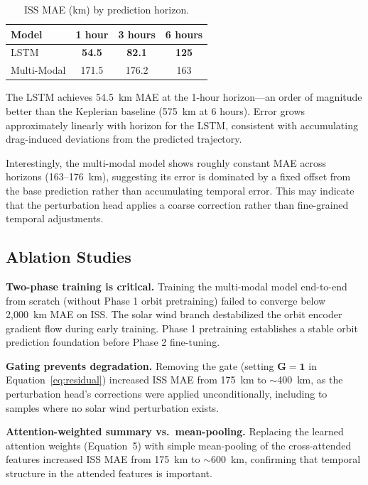 \documentclass[twocolumn]{article}
\begin{document}
\begin{table}[h]
\centering
\caption{ISS MAE (km) by prediction horizon.}
\label{tab:horizons}
\begin{tabular}{lccc}
\toprule
Model & 1 hour & 3 hours & 6 hours \\
\midrule
LSTM        & \textbf{54.5} & \textbf{82.1} & \textbf{125} \\
Multi-Modal & 171.5         & 176.2         & 163 \\
\bottomrule
\end{tabular}
\end{table}

The LSTM achieves 54.5~km MAE at the 1-hour horizon---an order of
magnitude better than the Keplerian baseline (575~km at 6 hours).
Error grows approximately linearly with horizon for the LSTM,
consistent with accumulating drag-induced deviations from the
predicted trajectory.

Interestingly, the multi-modal model shows roughly constant MAE
across horizons (163--176~km), suggesting its error is dominated by
a fixed offset from the base prediction rather than accumulating
temporal error. This may indicate that the perturbation head applies
a coarse correction rather than fine-grained temporal adjustments.

\subsection{Ablation Studies}
\label{sec:ablation}

\textbf{Two-phase training is critical.} Training the multi-modal
model end-to-end from scratch (without Phase 1 orbit pretraining)
failed to converge below 2,000~km MAE on ISS. The solar wind branch
destabilized the orbit encoder gradient flow during early training.
Phase 1 pretraining establishes a stable orbit prediction foundation
before Phase 2 fine-tuning.

\textbf{Gating prevents degradation.} Removing the gate (setting
$\mathbf{G} = \mathbf{1}$ in Equation~\ref{eq:residual}) increased
ISS MAE from 175~km to $\sim$400~km, as the perturbation head's
corrections were applied unconditionally, including to samples where
no solar wind perturbation exists.

\textbf{Attention-weighted summary vs.\ mean-pooling.} Replacing
the learned attention weights (Equation~5) with simple mean-pooling
of the cross-attended features increased ISS MAE from 175~km to
$\sim$600~km, confirming that temporal structure in the attended
features is important.
\end{document}
